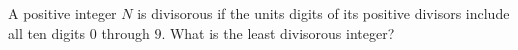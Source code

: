 A positive integer $N$ is divisorous if the units digits of its positive divisors include all ten digits $0$ through $9$. What is the least divisorous integer?
